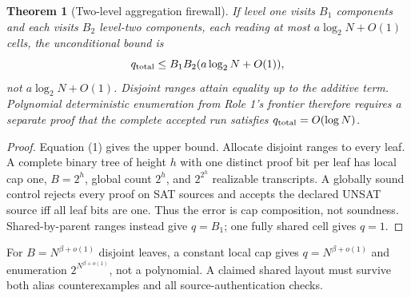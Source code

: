 \documentclass[11pt]{article}
\newtheorem{theorem}{Theorem}
\begin{document}
\begin{theorem}[Two-level aggregation firewall]
If level one visits $B_1$ components and each visits $B_2$ level-two
components, each reading at most $a\log_2N+O(1)$ cells, the unconditional
bound is
\[
q_{\rm total}\le B_1B_2(a\log_2N+O(1)),
\]
not $a\log_2N+O(1)$. Disjoint ranges attain equality up to the additive
term. Polynomial deterministic enumeration from Role 1's frontier therefore
requires a separate proof that the \emph{complete accepted run} satisfies
$q_{\rm total}=O(\log N)$.
\end{theorem}
\begin{proof}
Equation (1) gives the upper bound. Allocate disjoint ranges to every leaf.
A complete binary tree of height $h$ with one distinct proof bit per leaf has
local cap one, $B=2^h$, global count $2^h$, and $2^{2^h}$ realizable
transcripts. A globally sound control rejects every proof on SAT sources and
accepts the declared UNSAT source iff all leaf bits are one. Thus the error
is cap composition, not soundness. Shared-by-parent ranges instead give
$q=B_1$; one fully shared cell gives $q=1$.
\end{proof}

For $B=N^{\beta+o(1)}$ disjoint leaves, a constant local cap gives
$q=N^{\beta+o(1)}$ and enumeration
$2^{N^{\beta+o(1)}}$, not a polynomial. A claimed shared layout must survive
both alias counterexamples and all source-authentication checks.
\end{document}
